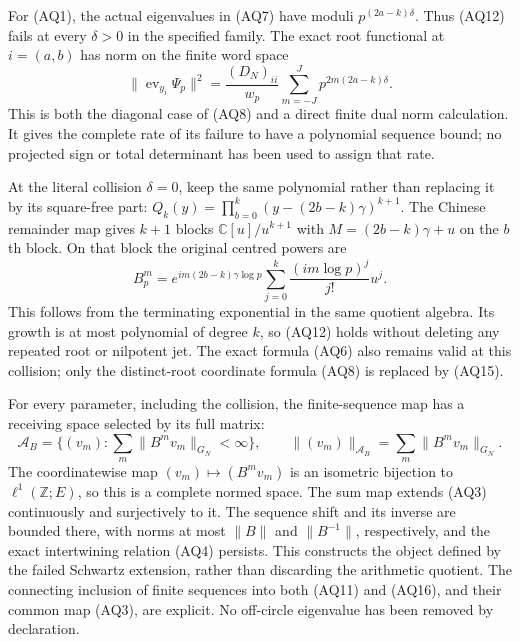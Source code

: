 For (AQ1), the actual eigenvalues in (AQ7) have moduli
$p^{(2a-k)\delta}$. Thus (AQ12) fails at every $\delta>0$ in the
specified family. The exact root functional at $i=(a,b)$ has norm on
the finite word space
\[
 \|\operatorname{ev}_{y_i}\Psi_p\|^2
   =\frac{(D_N)_{ii}}{w_p}
           \sum_{m=-J}^Jp^{2m(2a-k)\delta}.
 \tag{AQ14}
\]
This is both the diagonal case of (AQ8) and a direct finite dual norm
calculation. It gives the complete rate of its failure to have a
polynomial sequence bound; no projected sign or total determinant
has been used to assign that rate.

At the literal collision $\delta=0$, keep the same polynomial rather
than replacing it by its square-free part:
$Q_k(y)=\prod_{b=0}^k(y-(2b-k)\gamma)^{k+1}$.
The Chinese remainder map gives $k+1$ blocks
$\mathbb C[u]/u^{k+1}$ with $M=(2b-k)\gamma+u$ on the $b$th block.
On that block the original centred powers are
\[
 B_p^m=e^{im(2b-k)\gamma\log p}
       \sum_{j=0}^{k}\frac{(im\log p)^j}{j!}u^j.
 \tag{AQ15}
\]
This follows from the terminating exponential in the same quotient
algebra. Its growth is at most polynomial of degree $k$, so (AQ12)
holds without deleting any repeated root or nilpotent jet. The exact
formula (AQ6) also remains valid at this collision; only the
distinct-root coordinate formula (AQ8) is replaced by (AQ15).

For every parameter, including the collision, the finite-sequence map
has a receiving space selected by its full matrix:
\[
 \mathscr A_B=\{(v_m):\sum_m\|B^m v_m\|_{G_N}<\infty\},
 \qquad\|(v_m)\|_{\mathscr A_B}=\sum_m\|B^m v_m\|_{G_N}.
 \tag{AQ16}
\]
The coordinatewise map $(v_m)\mapsto(B^m v_m)$ is an isometric
bijection to $\ell^1(\mathbb Z;E)$, so this is a complete normed
space. The sum map extends (AQ3) continuously and surjectively to it.
The sequence shift and its inverse are bounded there, with norms at
most $\|B\|$ and $\|B^{-1}\|$, respectively, and the exact
intertwining relation (AQ4) persists. This constructs the object
defined by the failed Schwartz extension, rather than discarding
the arithmetic quotient. The connecting inclusion of finite
sequences into both (AQ11) and (AQ16), and their common map (AQ3),
are explicit. No off-circle eigenvalue has been removed by declaration.

